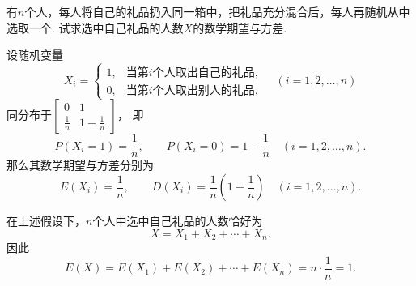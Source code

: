 \begin{example}[配对问题]
有\(n\)个人，每人将自己的礼品扔入同一箱中，把礼品充分混合后，每人再随机从中选取一个.
试求选中自己礼品的人数\(X\)的数学期望与方差.
\begin{solution}
设随机变量\begin{equation*}
    X_i = \left\{ \begin{array}{ll}
    1, & \text{当第\(i\)个人取出自己的礼品}, \\
    0, & \text{当第\(i\)个人取出别人的礼品},
    \end{array} \right.
    \quad(i=1,2,\dotsc,n)
\end{equation*}同分布于\(\begin{bmatrix}
	0 & 1 \\
	\frac{1}{n} & 1-\frac{1}{n}
\end{bmatrix}\)，
即\begin{equation*}
    P(X_i=1) = \frac{1}{n}, \qquad
    P(X_i=0) = 1-\frac{1}{n}
    \quad(i=1,2,\dotsc,n).
\end{equation*}
那么其数学期望与方差分别为\begin{equation*}
    E(X_i) = \frac{1}{n},
    \qquad
    D(X_i) = \frac{1}{n}\left(1-\frac{1}{n}\right)
    \quad(i=1,2,\dotsc,n).
\end{equation*}

在上述假设下，\(n\)个人中选中自己礼品的人数恰好为\begin{equation*}
    X = X_1+X_2+\dotsb+X_n.
\end{equation*}因此\begin{equation*}
    E(X) = E(X_1)+E(X_2)+\dotsb+E(X_n)
    = n \cdot \frac{1}{n}
    = 1.
\end{equation*}


\end{solution}
\end{example}
